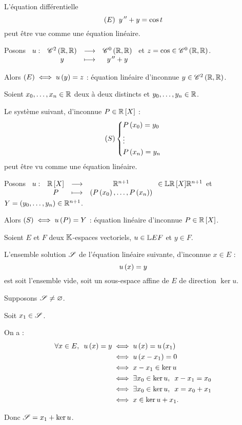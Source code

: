 \begin{ex}
L'équation différentielle \[\left(E\right)~y^{\,\prime\prime}+y=\cos t\] peut être vue comme une équation linéaire.

Posons \(\begin{array}[t]{cccc}u : & \mathscr{C}^{2}\left(\mathbb{R},\mathbb{R}\right) & \longrightarrow & \mathscr{C}^{0}\left(\mathbb{R},\mathbb{R}\right) \\ & y & \longmapsto & y^{\,\prime\prime}+y\end{array}\) et \(z=\cos\in\mathscr{C}^{0}\left(\mathbb{R},\mathbb{R}\right)\).

Alors \(\left(E\right)\iff u\left(y\right)=z\) : équation linéaire d'inconnue \(y\in\mathscr{C}^{2}\left(\mathbb{R},\mathbb{R}\right)\).
\end{ex}

\begin{ex}
Soient \(x_0,\dots,x_n\in\mathbb{R}\) deux à deux distincts et \(y_0,\dots,y_n\in\mathbb{R}\).

Le système suivant, d'inconnue \(P\in\poly[\R]\) : \[\left(S\right)\begin{dcases}
P\left(x_0\right)=y_0 \\
\vdots \\
P\left(x_n\right)=y_n
\end{dcases}\] peut être vu comme une équation linéaire.

Posons \(\fonction{u}{\poly[\R]}{\R^{n+1}}{P}{\paren{P\paren{x_0},\dots,P\paren{x_n}}}\in\L{\poly[\R]}{\R^{n+1}}\) et \(Y=\left(y_0,\dots,y_n\right)\in\mathbb{R}^{n+1}\).

Alors \(\left(S\right)\iff u\left(P\right)=Y\) : équation linéaire d'inconnue \(P\in\poly[\R]\).
\end{ex}

\begin{prop}
Soient \(E\) et \(F\) deux \(\mathbb{K}\)-espaces vectoriels, \(u\in\mathbb{L}{E}{F}\) et \(y\in F\).

L'ensemble solution \(\mathscr{S}\) de l'équation linéaire suivante, d'inconnue \(x\in E\) : \[u\left(x\right)=y\] est soit l'ensemble vide, soit un sous-espace affine de \(E\) de direction \(\ker u\).
\end{prop}

\begin{dem}
Supposons \(\mathscr{S}\not=\varnothing\).

Soit \(x_1\in\mathscr{S}\).

On a : \[\begin{aligned}
\quantifs{\forall x\in E}u\paren{x}=y&\ssi u\paren{x}=u\paren{x_1} \\
&\ssi u\paren{x-x_1}=0 \\
&\ssi x-x_1\in\ker u \\
&\ssi\quantifs{\exists x_0\in\ker u}x-x_1=x_0 \\
&\ssi\quantifs{\exists x_0\in\ker u}x=x_0+x_1 \\
&\ssi x\in\ker u+x_1.
\end{aligned}\]

Donc \(\mathscr{S}=x_1+\ker u\).
\end{dem}
